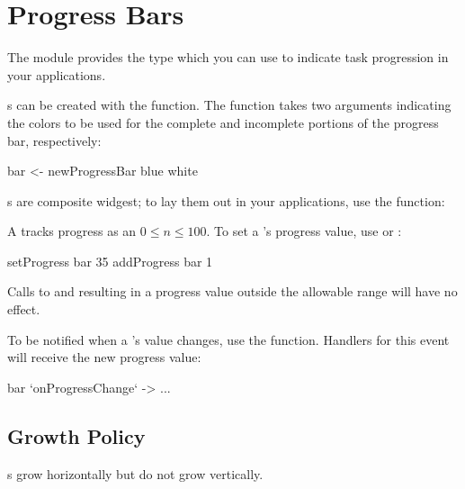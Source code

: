 \section{Progress Bars}
\label{sec:progress_bars}

The  module provides the  type which
you can use to indicate task progression in your applications.

s can be created with the 
function.  The function takes two  arguments indicating the
colors to be used for the complete and incomplete portions of the
progress bar, respectively:

\begin{haskellcode}
 bar <- newProgressBar blue white
\end{haskellcode}

s are composite widgest; to lay them out in your
applications, use the  function:


A  tracks progress as an  $0 \le n $.
To set a 's progress value, use  or
:

\begin{haskellcode}
 setProgress bar 35
 addProgress bar 1
\end{haskellcode}

Calls to  and  resulting in a progress
value outside the allowable range will have no effect.

To be notified when a 's value changes, use the
 function.  Handlers for this event will receive
the new progress value:

\begin{haskellcode}
 bar `onProgressChange` \newVal -> ...
\end{haskellcode}

\subsection{Growth Policy}

s grow horizontally but do not grow vertically.
